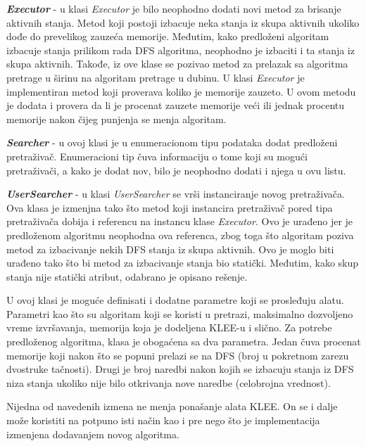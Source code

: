 \documentclass[12pt,oneside]{memoir}
\begin{document}
\begin{description}
    \item \textbf{\textit{Executor}} - u klasi \textit{Executor} je bilo neophodno dodati novi metod za brisanje aktivnih stanja. Metod koji postoji izbacuje neka stanja iz skupa aktivnih ukoliko dođe do prevelikog zauzeća memorije. Međutim, kako predloženi algoritam izbacuje stanja prilikom rada DFS algoritma, neophodno je izbaciti i ta stanja iz skupa aktivnih. Takođe, iz ove klase se pozivao metod za prelazak sa algoritma pretrage u širinu na algoritam pretrage u dubinu. U klasi \textit{Executor} je implementiran metod koji proverava koliko je memorije zauzeto. U ovom metodu je dodata i provera da li je procenat zauzete memorije veći ili jednak procentu memorije nakon čijeg punjenja se menja algoritam.
    
    \item \textbf{\textit{Searcher}} - u ovoj klasi je u enumeracionom tipu podataka dodat predloženi pretraživač. Enumeracioni tip čuva informaciju o tome koji su mogući pretraživači, a kako je dodat nov, bilo je neophodno dodati i njega u ovu listu.
    
    \item \textbf{\textit{UserSearcher}} \label{userSearcher} - u klasi \textit{UserSearcher} se vrši instanciranje novog pretraživača. Ova klasa je izmenjna tako što metod koji instancira pretraživač pored tipa pretraživača dobija i referencu na instancu klase \textit{Executor}. Ovo je urađeno jer je predloženom algoritmu neophodna ova referenca, zbog toga što algoritam poziva metod za izbacivanje nekih DFS stanja iz skupa aktivnih. Ovo je moglo biti urađeno tako što bi metod za izbacivanje stanja bio statički. Međutim, kako skup stanja nije statički atribut, odabrano je opisano rešenje. 
    
    U ovoj klasi je moguće definisati i dodatne parametre koji se prosleđuju alatu. Parametri kao što su algoritam koji se koristi u pretrazi, maksimalno dozvoljeno vreme izvršavanja, memorija koja je dodeljena KLEE-u i slično. Za potrebe predloženog algoritma, klasa je obogaćena sa dva parametra. Jedan čuva procenat memorije koji nakon što se popuni prelazi se na DFS (broj u pokretnom zarezu dvostruke tačnosti). Drugi je broj naredbi nakon kojih se izbacuju stanja iz DFS niza stanja ukoliko nije bilo otkrivanja nove naredbe (celobrojna vrednost).
\end{description}

Nijedna od navedenih izmena ne menja ponašanje alata KLEE. On se i dalje može koristiti na potpuno isti način kao i pre nego što je implementacija izmenjena dodavanjem novog algoritma.
\end{document}
